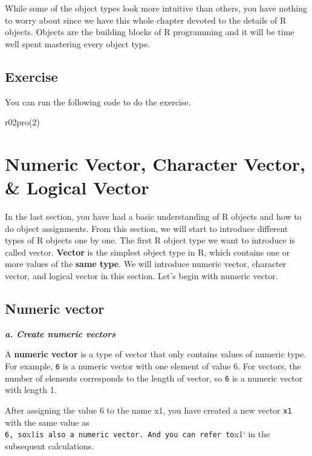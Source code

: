 \documentclass[
]{book}
\newenvironment{Shaded}{\begin{snugshade}}{\end{snugshade}}
\newcommand{\DecValTok}[1]{\textcolor[rgb]{0.00,0.00,0.81}{#1}}
\newcommand{\FunctionTok}[1]{\textcolor[rgb]{0.00,0.00,0.00}{#1}}
\newcommand{\NormalTok}[1]{#1}
\begin{document}
While some of the object types look more intuitive than others, you have nothing to worry about since we have this whole chapter devoted to the details of R objects. Objects are the building blocks of R programming and it will be time well spent mastering every object type.

\hypertarget{exercise-1}{%
\subsection{Exercise}\label{exercise-1}}

You can run the following code to do the exercise.

\begin{Shaded}
\begin{Highlighting}[]
\FunctionTok{r02pro}\NormalTok{(}\DecValTok{2}\NormalTok{)}
\end{Highlighting}
\end{Shaded}

\hypertarget{vector}{%
\section{Numeric Vector, Character Vector, \& Logical Vector}\label{vector}}

In the last section, you have had a basic understanding of R objects and how to do object assignments. From this section, we will start to introduce different types of R objects one by one. The first R object type we want to introduce is called vector. \textbf{Vector} is the simplest object type in R, which contains one or more values of the \textbf{same type}. We will introduce numeric vector, character vector, and logical vector in this section. Let's begin with numeric vector.

\hypertarget{numeric-vector}{%
\subsection{Numeric vector}\label{numeric-vector}}

\textbf{\emph{a. Create numeric vectors}}

A \textbf{numeric vector} is a type of vector that only contains values of numeric type. For example, \texttt{6} is a numeric vector with one element of value 6. For vectors, the number of elements corresponds to the length of vector, so \texttt{6} is a numeric vector with length 1.

After assigning the value 6 to the name x1, you have created a new vector \texttt{x1} with the same value as \texttt{6,\ so}x1\texttt{is\ also\ a\ numeric\ vector.\ And\ you\ can\ refer\ to}x1` in the subsequent calculations.
\end{document}
